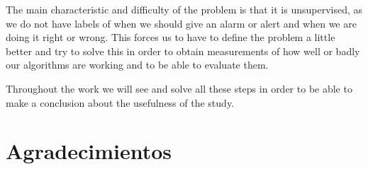 The main characteristic and difficulty of the problem is that it is unsupervised, as we do not have labels of when we should give an alarm or alert and when we are doing it right or wrong. This forces us to have to define the problem a little better and try to solve this in order to obtain measurements of how well or badly our algorithms are working and to be able to evaluate them.

Throughout the work we will see and solve all these steps in order to be able to make a conclusion about the usefulness of the study.

\chapter*{Agradecimientos}
\thispagestyle{empty}

